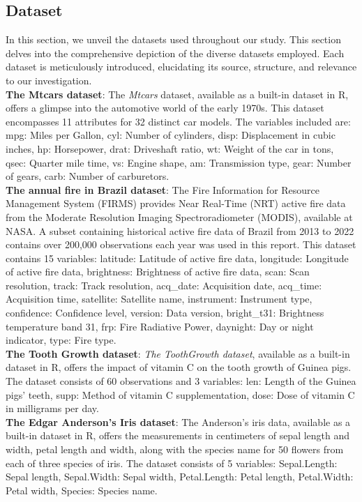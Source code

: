 \documentclass{article}\usepackage[]{graphicx}\usepackage[]{xcolor}
\begin{document}
\subsection{Dataset}
In this section, we unveil the datasets used throughout our study. This section delves into the comprehensive depiction of the diverse datasets employed. Each dataset is meticulously introduced, elucidating its source, structure, and relevance to our investigation.\\

\noindent
\textbf{The Mtcars dataset}: The \textit{Mtcars} dataset, available as a built-in dataset in R, offers a glimpse into the automotive world of the early 1970s. This dataset encompasses 11 attributes for 32 distinct car models. The variables included are: mpg: Miles per Gallon, cyl: Number of cylinders, disp: Displacement in cubic inches, hp: Horsepower, drat: Driveshaft ratio, wt: Weight of the car in tons, qsec: Quarter mile time, vs: Engine shape, am: Transmission type, gear: Number of gears, carb: Number of carburetors.\\

\noindent
\textbf{The annual fire in Brazil dataset}: The Fire Information for Resource Management System (FIRMS) provides Near Real-Time (NRT) active fire data from the Moderate Resolution Imaging Spectroradiometer (MODIS), available at NASA. A subset containing historical active fire data of Brazil from 2013 to 2022 contains over 200,000 observations each year was used in this report. This dataset contains 15 variables: latitude: Latitude of active fire data, longitude: Longitude of active fire data, brightness: Brightness of active fire data, scan: Scan resolution, track: Track resolution, acq\_date: Acquisition date, acq\_time: Acquisition time, satellite: Satellite name, instrument: Instrument type, confidence: Confidence level, version: Data version, bright\_t31: Brightness temperature band 31, frp: Fire Radiative Power, daynight: Day or night indicator, type: Fire type.\\

\noindent
\textbf{The Tooth Growth dataset}: \textit{The ToothGrowth dataset}, available as a built-in dataset in R, offers the impact of vitamin C on the tooth growth of Guinea pigs. The dataset consists of 60 observations and 3 variables: len: Length of the Guinea pigs' teeth, supp: Method of vitamin C supplementation, dose: Dose of vitamin C in milligrams per day.\\

\noindent
\textbf{The Edgar Anderson's Iris dataset}: The Anderson's iris data, available as a built-in dataset in R, offers the measurements in centimeters of sepal length and width, petal length and width, along with the species name for 50 flowers from each of three species of iris. The dataset consists of 5 variables: Sepal.Length: Sepal length, Sepal.Width: Sepal width, Petal.Length: Petal length, Petal.Width: Petal width, Species: Species name.\\
\end{document}
